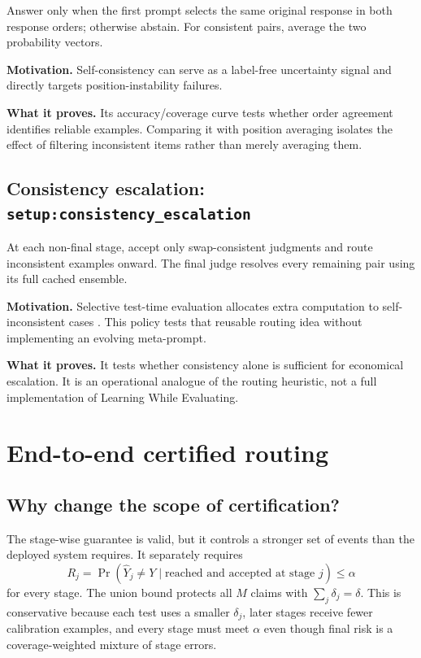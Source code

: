 \documentclass[10pt]{article}
\DeclareRobustCommand{\method}[1]{\nolinkurl{#1}}
\begin{document}
Answer only when the first prompt selects the same original response in both response
orders; otherwise abstain. For consistent pairs, average the two probability vectors.

\textbf{Motivation.} Self-consistency can serve as a label-free uncertainty signal and
directly targets position-instability failures.

\textbf{What it proves.} Its accuracy/coverage curve tests whether order agreement
identifies reliable examples. Comparing it with position averaging isolates the effect of
filtering inconsistent items rather than merely averaging them.

\subsection[Consistency escalation]{Consistency escalation: \method{setup:consistency_escalation}}

At each non-final stage, accept only swap-consistent judgments and route inconsistent
examples onward. The final judge resolves every remaining pair using its full cached
ensemble.

\textbf{Motivation.} Selective test-time evaluation allocates extra computation to
self-inconsistent cases \cite{jwa2026lwe}. This policy tests that reusable routing idea
without implementing an evolving meta-prompt.

\textbf{What it proves.} It tests whether consistency alone is sufficient for economical
escalation. It is an operational analogue of the routing heuristic, not a full
implementation of Learning While Evaluating.

\section{End-to-end certified routing}

\subsection{Why change the scope of certification?}

The stage-wise guarantee is valid, but it controls a stronger set of events than the
deployed system requires. It separately requires
\[
R_j=\Pr(\widehat{Y}_j\ne Y\mid\text{reached and accepted at stage }j)\leq\alpha
\]
for every stage. The union bound protects all $M$ claims with
$\sum_j\delta_j=\delta$. This is conservative because each test uses a smaller $\delta_j$,
later stages receive fewer calibration examples, and every stage must meet $\alpha$ even
though final risk is a coverage-weighted mixture of stage errors.
\end{document}
